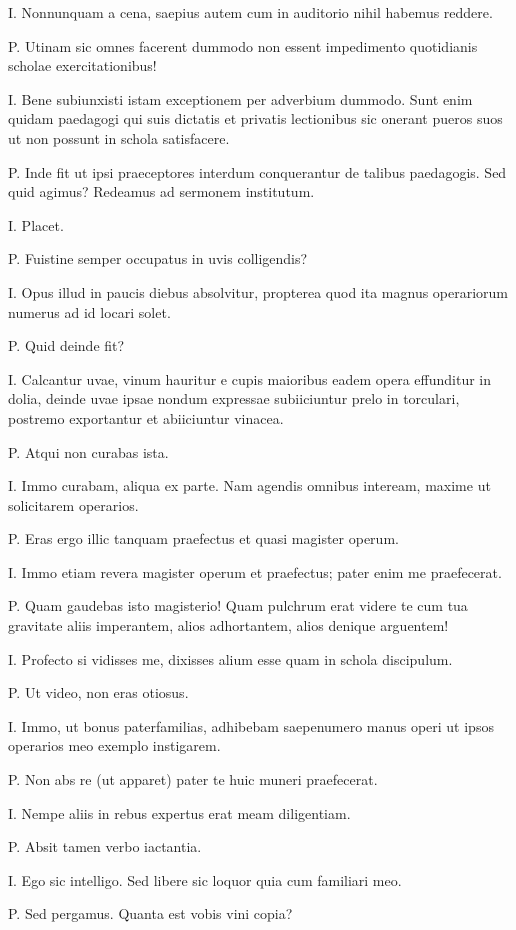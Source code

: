 \documentclass{article}
\begin{document}
I. Nonnunquam a cena, saepius autem cum in auditorio nihil habemus reddere.

P. Utinam sic omnes facerent dummodo non essent impedimento quotidianis scholae exercitationibus!

I. Bene subiunxisti istam exceptionem per adverbium dummodo. Sunt enim quidam paedagogi qui suis dictatis et privatis lectionibus sic onerant pueros suos ut non possunt in schola satisfacere.

P. Inde fit ut ipsi praeceptores interdum conquerantur de talibus paedagogis. Sed quid agimus? Redeamus ad sermonem institutum.

I. Placet.

P. Fuistine semper occupatus in uvis colligendis?

I. Opus illud in paucis diebus absolvitur, propterea quod ita magnus operariorum numerus ad id locari solet.

P. Quid deinde fit?

I. Calcantur uvae, vinum hauritur e cupis maioribus eadem opera effunditur in dolia, deinde uvae ipsae nondum expressae subiiciuntur prelo in torculari, postremo exportantur et abiiciuntur vinacea.

P. Atqui non curabas ista.

I. Immo curabam, aliqua ex parte. Nam agendis omnibus inteream, maxime ut solicitarem operarios.

P. Eras ergo illic tanquam praefectus et quasi magister operum.

I. Immo etiam revera magister operum et praefectus; pater enim me praefecerat.

P. Quam gaudebas isto magisterio! Quam pulchrum erat videre te cum tua gravitate aliis imperantem, alios adhortantem, alios denique arguentem!

I. Profecto si vidisses me, dixisses alium esse quam in schola discipulum.

P. Ut video, non eras otiosus.

I. Immo, ut bonus paterfamilias, adhibebam saepenumero manus operi ut ipsos operarios meo exemplo instigarem.

P. Non abs re (ut apparet) pater te huic muneri praefecerat.

I. Nempe aliis in rebus expertus erat meam diligentiam.

P. Absit tamen verbo iactantia.

I. Ego sic intelligo. Sed libere sic loquor quia cum familiari meo.

P. Sed pergamus. Quanta est vobis vini copia?
\end{document}
